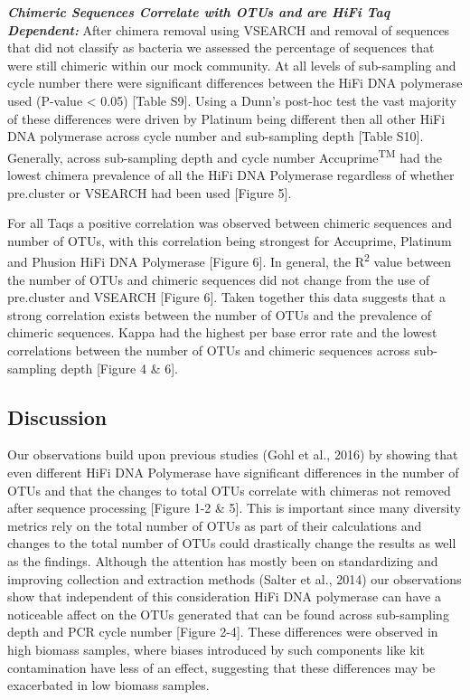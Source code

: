 \documentclass[12pt,]{article}
\begin{document}
\textbf{\emph{Chimeric Sequences Correlate with OTUs and are HiFi Taq
Dependent:}} After chimera removal using VSEARCH and removal of
sequences that did not classify as bacteria we assessed the percentage
of sequences that were still chimeric within our mock community. At all
levels of sub-sampling and cycle number there were significant
differences between the HiFi DNA polymerase used (P-value \textless{}
0.05) {[}Table S9{]}. Using a Dunn's post-hoc test the vast majority of
these differences were driven by Platinum being different then all other
HiFi DNA polymerase across cycle number and sub-sampling depth {[}Table
S10{]}. Generally, across sub-sampling depth and cycle number
Accuprime\textsuperscript{TM} had the lowest chimera prevalence of all
the HiFi DNA Polymerase regardless of whether pre.cluster or VSEARCH had
been used {[}Figure 5{]}.

For all Taqs a positive correlation was observed between chimeric
sequences and number of OTUs, with this correlation being strongest for
Accuprime, Platinum and Phusion HiFi DNA Polymerase {[}Figure 6{]}. In
general, the R\textsuperscript{2} value between the number of OTUs and
chimeric sequences did not change from the use of pre.cluster and
VSEARCH {[}Figure 6{]}. Taken together this data suggests that a strong
correlation exists between the number of OTUs and the prevalence of
chimeric sequences. Kappa had the highest per base error rate and the
lowest correlations between the number of OTUs and chimeric sequences
across sub-sampling depth {[}Figure 4 \& 6{]}.

\newpage

\subsection{Discussion}\label{discussion}

Our observations build upon previous studies (Gohl et al., 2016) by
showing that even different HiFi DNA Polymerase have significant
differences in the number of OTUs and that the changes to total OTUs
correlate with chimeras not removed after sequence processing {[}Figure
1-2 \& 5{]}. This is important since many diversity metrics rely on the
total number of OTUs as part of their calculations and changes to the
total number of OTUs could drastically change the results as well as the
findings. Although the attention has mostly been on standardizing and
improving collection and extraction methods (Salter et al., 2014) our
observations show that independent of this consideration HiFi DNA
polymerase can have a noticeable affect on the OTUs generated that can
be found across sub-sampling depth and PCR cycle number {[}Figure
2-4{]}. These differences were observed in high biomass samples, where
biases introduced by such components like kit contamination have less of
an effect, suggesting that these differences may be exacerbated in low
biomass samples.
\end{document}
